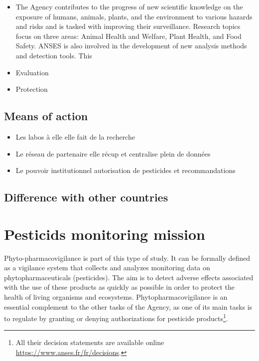 \begin{itemize}
\item The Agency contributes to the progress of new scientific knowledge on the exposure of humans, animals, plants, and the environment to various hazards and risks and is tasked with improving their surveillance. Research topics focus on three areas: Animal Health and Welfare, Plant Health, and Food Safety. ANSES is also involved in the development of new analysis methods and detection tools. This 
\item Evaluation
\item Protection
\end{itemize}



\subsection{Means of action}

\begin{itemize}
\item Les labos à elle elle fait de la recherche
\item Le réseau de partenaire elle récup et centralise plein de données
\item Le pouvoir institutionnel autorisation de pesticides et recommandations
\end{itemize}

\subsection{Difference with other countries}



\section{Pesticids monitoring mission}\label{chp:2:2}

Phyto-pharmacovigilance is part of this type of study. It can be formally defined as a vigilance system that collects and analyzes monitoring data on phytopharmaceuticals (pesticides). The aim is to detect adverse effects associated with the use of these products as quickly as possible in order to protect the health of living organisms and ecosystems. Phytopharmacovigilance is an essential complement to the other tasks of the Agency, as one of its main tasks is to regulate by granting or denying authorizations for pesticide products\footnote{All their decision statements are available online \url{https://www.anses.fr/fr/decisions}.}.

